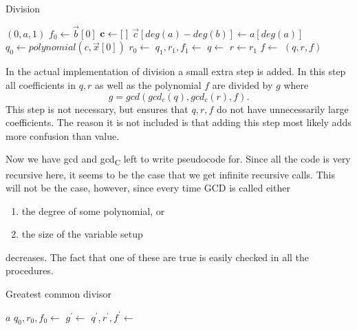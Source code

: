 \begin{algorithm}[H]
  \caption{Division}
  \begin{algorithmic}[1]
        \State \Return $(0,a,1)$
      \EndIf
      \State $f_0\gets \vec{b}[0]$
      \State $\mathbf{c}\gets [\hspace*{1mm}]$
      \State $\vec{c}[deg(a)-deg(b)]\gets a[deg(a)]$
      \State $q_0\gets polynomial(c,\vec{x}[0])$
      \State $r_0\gets$ 
      \State $q_1,r_1,f_1 \gets$ 
      \State $q\gets $ 
      \State $r\gets r_1$
      \State $f\gets$ 
      \State \Return $(q,r,f)$
    \EndProcedure
  \end{algorithmic}
\end{algorithm}
\begin{remark}
  In the actual implementation of division a small extra step is added. In this step all coefficients in $q,r$ as well as the polynomial $f$ are divided by $g$ where
  \begin{equation}
    g = gcd(gcd_c(q),gcd_c(r),f).
  \end{equation}
  This step is not necessary, but ensures that $q,r,f$ do not have unnecessarily large coefficients. The reason it is not included is that adding this step most likely adds more confusion than value.
\end{remark}
Now we have gcd and gcd\textsubscript{C} left to write pseudocode for. Since all the code is very recursive here, it seems to be the case that we get infinite recursive calls. This will not be the case, however, since every time GCD is called either
\begin{enumerate}
  \item the degree of some polynomial, or
  \item the size of the variable setup
\end{enumerate}
decreases. The fact that one of these are true is easily checked in all the procedures.
\begin{algorithm}[H]
  \caption{Greatest common divisor}
  \begin{algorithmic}[1]
        \State \Return $a$
      \EndIf
      \State $q_0,r_0,f_0\gets$ 
      \State $g^\prime\gets$ 
      \State $q^\prime,r^\prime,f^\prime\gets$ 
      \State \Return {}
    \EndProcedure
  \end{algorithmic}
\end{algorithm}
